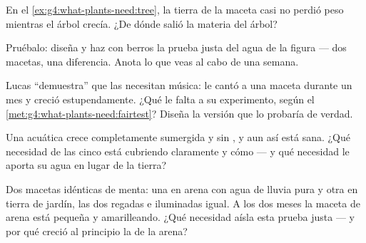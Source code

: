 \begin{exercise}[$\star$]\label{exo:g4:what-plants-need:7}
En el \cref{ex:g4:what-plants-need:tree}, la tierra de la maceta casi
no perdió peso mientras el árbol crecía. ¿De dónde salió la materia
del árbol?
\end{exercise}

\begin{exercise}[$\star$]\label{exo:g4:what-plants-need:8}
Pruébalo: diseña y haz con berros la prueba justa del agua de la
figura --- dos macetas, una diferencia. Anota lo que veas al cabo de
una semana.
\end{exercise}

\begin{exercise}[$\star\star$]\label{exo:g4:what-plants-need:9}
Lucas ``demuestra'' que las  necesitan música: le cantó a una
maceta durante un mes y creció estupendamente. ¿Qué le falta a su
experimento, según el \cref{met:g4:what-plants-need:fairtest}? Diseña
la versión que lo probaría de verdad.
\end{exercise}

\begin{exercise}[$\star\star$]\label{exo:g4:what-plants-need:10}
Una  acuática crece completamente sumergida y sin , y aun
así está sana. ¿Qué necesidad de las cinco está cubriendo claramente y
cómo --- y qué necesidad le aporta su agua en lugar de la tierra?
\end{exercise}

\begin{exercise}[$\star\star\star$]\label{exo:g4:what-plants-need:11}
Dos macetas idénticas de menta: una en arena con agua de lluvia pura y
otra en tierra de jardín, las dos regadas e iluminadas igual. A los
dos meses la maceta de arena está pequeña y amarilleando. ¿Qué
necesidad aísla esta prueba justa --- y por qué creció al principio la
 de la arena?
\end{exercise}
